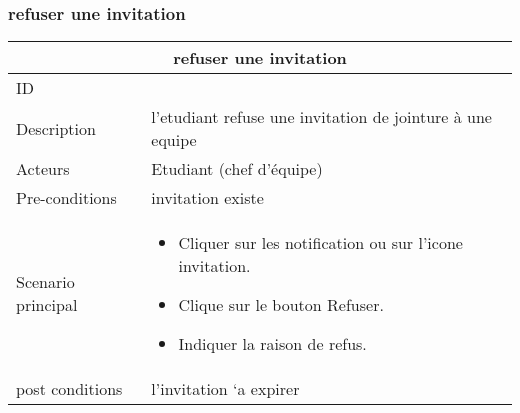 \documentclass[11pt,fleqn]{book} %
\begin{document}
\subsubsection{refuser une invitation}
\begin{center}
\begin{tabularx}{1\textwidth} { | p{4cm} | >{\raggedright\arraybackslash}X |  }
  \hline
  \multicolumn{2}{|c|}{refuser une invitation} \\
 \hline
 ID & 4  \\
 \hline
 Description  & l'etudiant refuse une invitation de jointure à une equipe \\
  \hline
 Acteurs  & Etudiant (chef d'équipe)  \\
  \hline
 Pre-conditions  & invitation existe\\
 \hline
 Scenario principal  &  
 \begin{itemize}
     \item  Cliquer sur les notification ou sur l’icone invitation.
     \item Clique sur le bouton Refuser.
     \item  Indiquer la raison de refus.

 \end{itemize}\\
  \hline
 post conditions  &  l’invitation `a expirer  \\
  \hline
\end{tabularx}
\label{tbl:nicetablelesstable}
\end{center}
\end{document}
